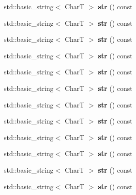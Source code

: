 \begin{DoxyCompactItemize}
std\+::basic\+\_\+string$<$ CharT $>$ {\bfseries str} () const
\item 
\mbox{\label{structtestbuf_a077afc7549a2a7a21f840ba884695eab}} 
std\+::basic\+\_\+string$<$ CharT $>$ {\bfseries str} () const
\item 
\mbox{\label{structtestbuf_a077afc7549a2a7a21f840ba884695eab}} 
std\+::basic\+\_\+string$<$ CharT $>$ {\bfseries str} () const
\item 
\mbox{\label{structtestbuf_a077afc7549a2a7a21f840ba884695eab}} 
std\+::basic\+\_\+string$<$ CharT $>$ {\bfseries str} () const
\item 
\mbox{\label{structtestbuf_a077afc7549a2a7a21f840ba884695eab}} 
std\+::basic\+\_\+string$<$ CharT $>$ {\bfseries str} () const
\item 
\mbox{\label{structtestbuf_a077afc7549a2a7a21f840ba884695eab}} 
std\+::basic\+\_\+string$<$ CharT $>$ {\bfseries str} () const
\item 
\mbox{\label{structtestbuf_a077afc7549a2a7a21f840ba884695eab}} 
std\+::basic\+\_\+string$<$ CharT $>$ {\bfseries str} () const
\item 
\mbox{\label{structtestbuf_a077afc7549a2a7a21f840ba884695eab}} 
std\+::basic\+\_\+string$<$ CharT $>$ {\bfseries str} () const
\item 
\mbox{\label{structtestbuf_a077afc7549a2a7a21f840ba884695eab}} 
std\+::basic\+\_\+string$<$ CharT $>$ {\bfseries str} () const
\item 
\mbox{\label{structtestbuf_a077afc7549a2a7a21f840ba884695eab}} 
std\+::basic\+\_\+string$<$ CharT $>$ {\bfseries str} () const
\item 
\mbox{\label{structtestbuf_a077afc7549a2a7a21f840ba884695eab}} 
std\+::basic\+\_\+string$<$ CharT $>$ {\bfseries str} () const
\item 
\mbox{\label{structtestbuf_a077afc7549a2a7a21f840ba884695eab}} 
std\+::basic\+\_\+string$<$ CharT $>$ {\bfseries str} () const

\end{DoxyCompactItemize}
